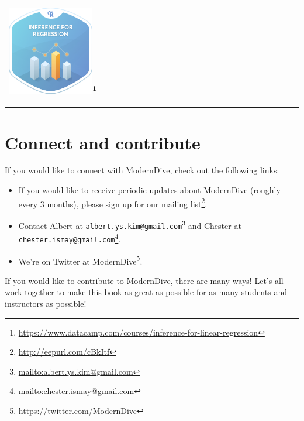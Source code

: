 \documentclass[12pt, krantz2,]{krantz}
\providecommand{\tightlist}{%
  \setlength{\itemsep}{0pt}\setlength{\parskip}{0pt}}
\renewcommand{\href}[2]{#2\footnote{\url{#1}}}
\begin{document}
\begin{longtable}[]{@{}lll@{}}
\begin{minipage}[t]{0.30\columnwidth}
\href{https://www.datacamp.com/courses/inference-for-linear-regression}{\includegraphics[width=0.6\textwidth]{images/datacamp_inference_for_regression.png}}\strut
\end{minipage}\tabularnewline
\bottomrule
\end{longtable}

\begin{center}\rule{0.5\linewidth}{\linethickness}\end{center}

\hypertarget{sec:connect-contribute}{%
\section{Connect and contribute}\label{sec:connect-contribute}}

If you would like to connect with ModernDive, check out the following links:

\begin{itemize}
\tightlist
\item
  If you would like to receive periodic updates about ModernDive (roughly every 3 months), please sign up for our \href{http://eepurl.com/cBkItf}{mailing list}.
\item
  Contact Albert at \href{mailto:albert.ys.kim@gmail.com}{\nolinkurl{albert.ys.kim@gmail.com}} and Chester at \href{mailto:chester.ismay@gmail.com}{\nolinkurl{chester.ismay@gmail.com}}.
\item
  We're on Twitter at \href{https://twitter.com/ModernDive}{ModernDive}.
\end{itemize}

If you would like to contribute to ModernDive, there are many ways! Let's all work together to make this book as great as possible for as many students and instructors as possible!
\end{document}
